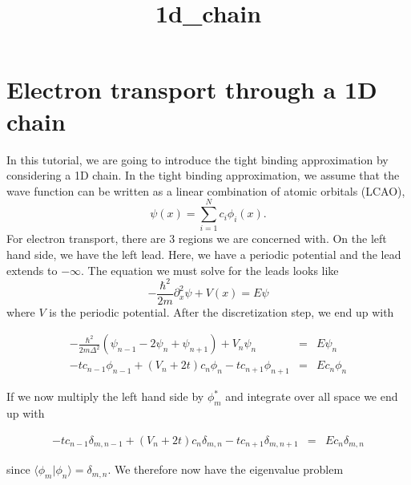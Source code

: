 \documentclass[11pt]{article}
\title{1d\_chain}
\begin{document}
    
    
    \maketitle
    
    

    
    \section{Electron transport through a 1D
chain}\label{electron-transport-through-a-1d-chain}

In this tutorial, we are going to introduce the tight binding
approximation by considering a 1D chain. In the tight binding
approximation, we assume that the wave function can be written as a
linear combination of atomic orbitals (LCAO),
\[\psi(x) = \sum_{i=1}^{N} c_i \phi_i(x).\] For electron transport,
there are 3 regions we are concerned with. On the left hand side, we
have the left lead. Here, we have a periodic potential and the lead
extends to \(-\infty\). The equation we must solve for the leads looks
like \[
-\frac{\hbar^2}{2m} \partial_x^2 \psi + V(x) = E \psi
\] where \(V\) is the periodic potential. After the discretization step,
we end up with

\begin{eqnarray}
-\frac{\hbar^2}{2m\Delta^2}(\psi_{n-1} - 2 \psi_n + \psi_{n+1}) + V_n \psi_n &=& E \psi_n\\
-tc_{n-1}\phi_{n-1} + (V_n + 2t) c_n\phi_n -t c_{n+1} \phi_{n+1} &=& E c_n \phi_n
\end{eqnarray}

If we now multiply the left hand side by \(\phi_m^*\) and integrate over
all space we end up with

\begin{eqnarray}
-tc_{n-1}\delta_{m, n-1} + (V_n + 2t) c_n\delta_{m,n} -t c_{n+1} \delta_{m, n+1} &=& E c_n \delta_{m,n}
\end{eqnarray}

since \(\langle \phi_m | \phi_n \rangle = \delta_{m,n}\). We therefore
now have the eigenvalue problem
\end{document}
